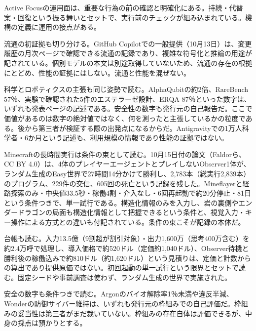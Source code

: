 \documentclass[lualatex,a4paper,10pt]{jlreq}
\begin{document}
Active Focusの運用面は、重要な行為の前の確認と明確化にある。持続・代替案・回復という振る舞いとセットで、実行前のチェックが組み込まれている。機構の定義に運用の接点がある。
\cite{B01,B62,B63,B02,B64,B03}


流通の初証拠も切り分ける。GitHub Copilotでの一般提供（10月13日）は、変更履歴の月次ページで確認できる流通の記録であり、複雑な符号化と推論の用途が記されている。個別モデルの本文は別途取得していないため、流通の存在の根拠にとどめ、性能の証拠にはしない。流通と性能を混ぜない。
\cite{B05,B65,B08,B04,B07,B06}


科学とロボティクスの主張も同じ姿勢で読む。AlphaQubitの約2倍、RareBench 57％、実験で確認された5件のエステラーゼ設計、ERQA 87％といった数字は、いずれも発表ページの記述である。安全性の数字も発行元の自己報告だ。ここで価値があるのは数字の絶対値ではなく、何を測ったと主張しているかの粒度である。後から第三者が検証する際の出発点になるからだ。Antigravityでの1万人科学者・6か月という記述も、利用規模の情報であり性能の証拠ではない。
\cite{B05,B65,B08,B04,B07,B06}


Minecraftの長時間実行は条件の束として読む。10月15日付の論文（Faldorら、CC BY 4.0）は、4体のプレイヤーエージェントとプレイしないObserver1体が、ランダム生成のEasy世界で27時間14分かけて勝利し、2,783本（総実行2,839本）のプログラム、229件の交信、605回の死亡という記録を残した。Mineflayerと経路探索のみ・中央値33.5秒・稼働4割・介入なし・6回再起動で約20分停止・81日という条件つきで、単一試行である。構造化情報のみを入力し、岩の裏側やエンダードラゴンの局面も構造化情報として把握できるという条件と、視覚入力・キー操作による方式との違いも付記されている。条件の束こそが記録の本体だ。
\cite{B05,B65,B08,B04,B07,B06}


台帳も読む。入力13.5億（9割超が割引対象）・出力1,600万（思考400万含む）を約2.4万呼で処理し、導入価格で約520ドル（定価約1,040ドル）、Observer待機と勝利後の稼働込みで約810ドル（約1,620ドル）という見積りは、定価と計数からの算出であり提供原価ではない。初回起動の単一試行という限界とセットで読む。固定シードや事前調査は使わず、ランダム生成の世界で実施された。
\cite{B05,B65,B08,B04,B07,B06}


安全の数字も条件つきで読む。Argonのバイオ解除率1％未満や違反半減、Wonderの防御サイバー維持は、いずれも発行元の枠組みでの自己評価だ。枠組みの妥当性は第三者がまだ裁いていない。枠組みの存在自体は評価できるが、中身の採点は預かりとする。
\cite{B01,B62,B63,B02,B64,B03,B05,B65,B08,B04,B07,B06}
\end{document}
